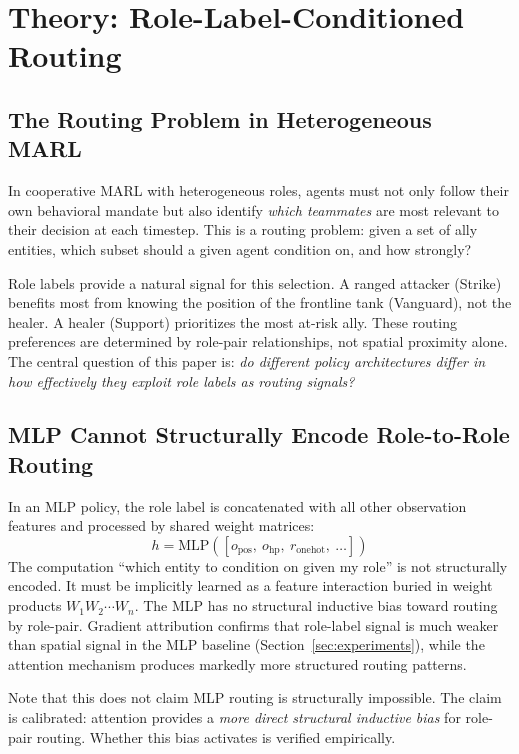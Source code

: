 \section{Theory: Role-Label-Conditioned Routing}
\label{sec:theory}

\subsection{The Routing Problem in Heterogeneous MARL}

In cooperative MARL with heterogeneous roles, agents must not only follow their own behavioral mandate but also identify \emph{which teammates} are most relevant to their decision at each timestep. This is a routing problem: given a set of ally entities, which subset should a given agent condition on, and how strongly?

Role labels provide a natural signal for this selection. A ranged attacker (Strike) benefits most from knowing the position of the frontline tank (Vanguard), not the healer. A healer (Support) prioritizes the most at-risk ally. These routing preferences are determined by role-pair relationships, not spatial proximity alone. The central question of this paper is: \emph{do different policy architectures differ in how effectively they exploit role labels as routing signals?}

\subsection{MLP Cannot Structurally Encode Role-to-Role Routing}

In an MLP policy, the role label is concatenated with all other observation features and processed by shared weight matrices:
\[
h = \text{MLP}([o_{\text{pos}},\ o_{\text{hp}},\ r_{\text{onehot}},\ \ldots])
\]
The computation ``which entity to condition on given my role'' is not structurally encoded. It must be implicitly learned as a feature interaction buried in weight products $W_1 W_2 \cdots W_n$. The MLP has no structural inductive bias toward routing by role-pair. Gradient attribution confirms that role-label signal is much weaker than spatial signal in the MLP baseline (Section~\ref{sec:experiments}), while the attention mechanism produces markedly more structured routing patterns.

Note that this does not claim MLP routing is structurally impossible. The claim is calibrated: attention provides a \emph{more direct structural inductive bias} for role-pair routing. Whether this bias activates is verified empirically.

